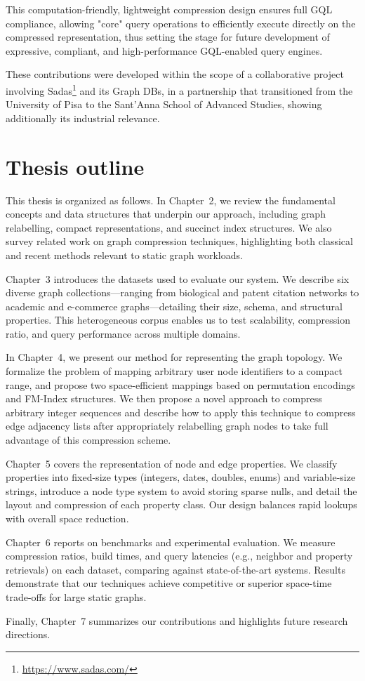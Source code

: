 This computation-friendly, lightweight compression design ensures full GQL compliance, allowing "core" query operations to efficiently execute directly on the compressed representation, thus setting the stage for future development of expressive, compliant, and high-performance GQL-enabled query engines.


These contributions were developed within the scope of a collaborative project involving Sadas\footnote{\url{https://www.sadas.com/}} and its Graph DBs, in a partnership that transitioned from the University of Pisa to the Sant'Anna School of Advanced Studies, showing additionally its industrial relevance.

\section{Thesis outline}

This thesis is organized as follows. In Chapter~2, we review the fundamental concepts and data structures that underpin our approach, including graph relabelling, compact representations, and succinct index structures. We also survey related work on graph compression techniques, highlighting both classical and recent methods relevant to static graph workloads.

Chapter~3 introduces the datasets used to evaluate our system. We describe six diverse graph collections—ranging from biological and patent citation networks to academic and e-commerce graphs—detailing their size, schema, and structural properties. This heterogeneous corpus enables us to test scalability, compression ratio, and query performance across multiple domains.

In Chapter~4, we present our method for representing the graph topology. We formalize the problem of mapping arbitrary user node identifiers to a compact range, and propose two space-efficient mappings based on permutation encodings and FM-Index structures. We then propose a novel approach to compress arbitrary integer sequences and describe how to apply this technique to compress edge adjacency lists after appropriately relabelling graph nodes to take full advantage of this compression scheme.

Chapter~5 covers the representation of node and edge properties. We classify properties into fixed-size types (integers, dates, doubles, enums) and variable-size strings, introduce a node type system to avoid storing sparse nulls, and detail the layout and compression of each property class. Our design balances rapid lookups with overall space reduction.

Chapter~6 reports on benchmarks and experimental evaluation. We measure compression ratios, build times, and query latencies (e.g., neighbor and property retrievals) on each dataset, comparing against state-of-the-art systems. Results demonstrate that our techniques achieve competitive or superior space-time trade-offs for large static graphs.

Finally, Chapter~7 summarizes our contributions and highlights future research directions.

